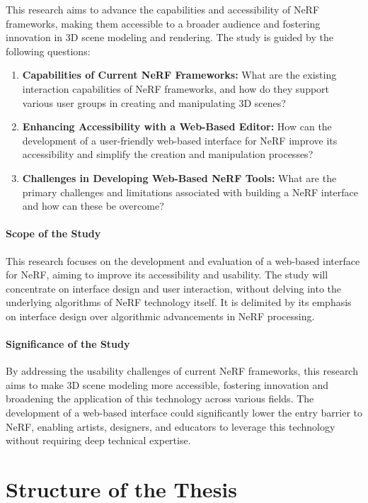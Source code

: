 This research aims to advance the capabilities and accessibility of NeRF frameworks, making them accessible to a broader audience and fostering innovation in 3D scene modeling and rendering. The study is guided by the following questions:

\begin{enumerate}
    \item \textbf{Capabilities of Current NeRF Frameworks:} What are the existing interaction capabilities of NeRF frameworks, and how do they support various user groups in creating and manipulating 3D scenes?

    \item \textbf{Enhancing Accessibility with a Web-Based Editor:} How can the development of a user-friendly web-based interface for NeRF improve its accessibility and simplify the creation and manipulation processes?

    \item \textbf{Challenges in Developing Web-Based NeRF Tools:} What are the primary challenges and limitations associated with building a NeRF interface and how can these be overcome?
\end{enumerate}

\paragraph{Scope of the Study}
This research focuses on the development and evaluation of a web-based interface for NeRF, aiming to improve its accessibility and usability. 
The study will concentrate on interface design and user interaction, without delving into the underlying algorithms of NeRF technology itself. 
It is delimited by its emphasis on interface design over algorithmic advancements in NeRF processing.

\paragraph{Significance of the Study}
By addressing the usability challenges of current NeRF frameworks, this research aims to make 3D scene modeling more accessible, fostering innovation and broadening the application of this technology across various fields. 
The development of a web-based interface could significantly lower the entry barrier to NeRF, enabling artists, designers, and educators to leverage this technology without requiring deep technical expertise.

\section{Structure of the Thesis}
\label{sec:intro:structure}

